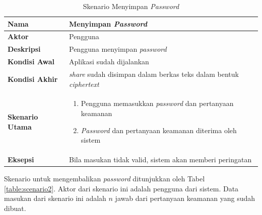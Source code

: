 \begin{table}[H]
	\centering
	\caption{Skenario Menyimpan \textit{Password}} \label{table:scenario1}
	\begin{tabular}{|l|p{12cm}|}
		\hline
		\textbf{Nama} 					& Menyimpan \textit{Password} 																											\\ \hline
		\textbf{Aktor}					& Pengguna																																					\\ \hline
		\textbf{Deskripsi} 			& Pengguna menyimpan \textit{password} 																							\\ \hline
		\textbf{Kondisi Awal} 	& Aplikasi sudah dijalankan																													\\ \hline
		\textbf{Kondisi Akhir}	& \textit{share} sudah disimpan dalam berkas teks dalam bentuk \textit{ciphertext}	\\ \hline
		\textbf{Skenario Utama} & \begin{enumerate}[itemsep=0mm]\item Pengguna memasukkan \textit{password} dan pertanyaan keamanan \item \textit{Password} dan pertanyaan keamanan diterima oleh sistem\end{enumerate} \\ \hline
		\textbf{Eksepsi}				& Bila masukan tidak valid, sistem akan memberi peringatan \\ \hline
	\end{tabular}
\end{table}

Skenario untuk mengembalikan \textit{password} ditunjukkan oleh Tabel \ref{table:scenario2}. Aktor dari skenario ini adalah pengguna dari sistem. Data masukan dari skenario ini adalah $n$ jawab dari pertanyaan keamanan yang sudah dibuat.

